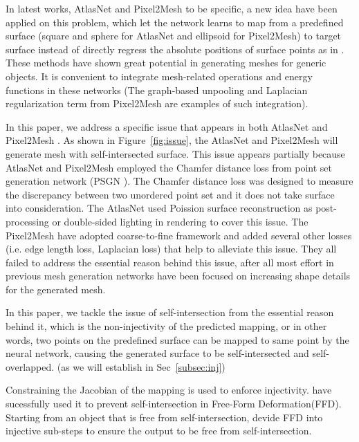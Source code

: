 In latest works, AtlasNet \cite{atlasnet} and Pixel2Mesh \cite{pixel2mesh} to be specific, a new idea have been applied on this problem, which let the network learns to map from a predefined surface (square and sphere for AtlasNet and ellipsoid for Pixel2Mesh) to target surface instead of directly regress the absolute positions of surface points as in \cite{PSGN}. These methods have shown great potential in generating meshes for generic objects. It is convenient to integrate mesh-related operations and energy functions in these networks (The graph-based unpooling and Laplacian regularization term from Pixel2Mesh are examples of such integration).

In this paper, we address a specific issue that appears in both AtlasNet \cite{atlasnet} and Pixel2Mesh \cite{pixel2mesh}. As shown in Figure~\ref{fig:issue}, the AtlasNet and Pixel2Mesh will generate mesh with self-intersected surface. This issue appears partially because AtlasNet and Pixel2Mesh employed the Chamfer distance loss from point set generation network (PSGN \cite{PSGN}). The Chamfer distance loss was designed to measure the discrepancy between two unordered point set and it does not take surface into consideration. The AtlasNet used Poission surface reconstruction as post-processing or double-sided lighting in rendering to cover this issue. The Pixel2Mesh have adopted coarse-to-fine framework and added several other losses (i.e. edge length loss, Laplacian loss) that help to alleviate this issue. They all failed to address the essential reason behind this issue, after all most effort in previous mesh generation networks have been focused on increasing shape details for the generated mesh.

In this paper, we tackle the issue of self-intersection from the essential reason behind it, which is the non-injectivity of the predicted mapping, or in other words, two points on the predefined surface can be mapped to same point by the neural network, causing the generated surface to be self-intersected and self-overlapped. (as we will establish in Sec~\ref{subsec:inj})

Constraining the Jacobian of the mapping is used to enforce injectivity. \cite{tvcgprevent} have sucessfully used it to prevent self-intersection in Free-Form Deformation(FFD). Starting from an object that is free from self-intersection, \cite{tvcgprevent} devide FFD into injective sub-steps to ensure the output to be free from self-intersection.

